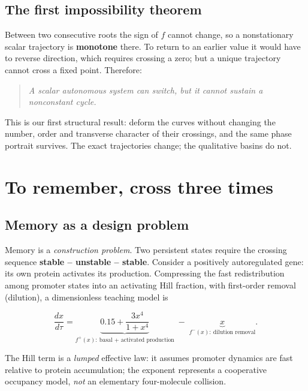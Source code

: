 \documentclass[12pt]{article}
\begin{document}
\subsection{The first impossibility theorem}

Between two consecutive roots the sign of $f$ cannot change, so a nonstationary
scalar trajectory is \textbf{monotone} there. To return to an earlier value it would
have to reverse direction, which requires crossing a zero; but a unique trajectory
cannot cross a fixed point. Therefore:

\begin{quote}
\centering
\emph{A scalar autonomous system can switch, but it cannot sustain a nonconstant
cycle.}
\end{quote}

This is our first structural result: deform the curves without changing the number,
order and transverse character of their crossings, and the same phase portrait
survives. The exact trajectories change; the qualitative basins do not.

\newpage

\section{To remember, cross three times}

\subsection{Memory as a design problem}

Memory is a \emph{construction problem}. Two persistent states require the crossing
sequence \textbf{stable -- unstable -- stable}. Consider a positively autoregulated
gene: its own protein activates its production. Compressing the fast redistribution
among promoter states into an activating Hill fraction, with first-order removal
(dilution), a dimensionless teaching model is

\begin{equation}
\frac{dx}{d\tau} =
\underbrace{0.15 + \frac{3x^{4}}{1+x^{4}}}_{f^{+}(x):\ \text{basal + activated production}}
\;-\;
\underbrace{x}_{f^{-}(x):\ \text{dilution removal}}.
\label{eq:autoreg}
\end{equation}

The Hill term is a \emph{lumped} effective law: it assumes promoter dynamics are fast
relative to protein accumulation; the exponent represents a cooperative occupancy
model, \emph{not} an elementary four-molecule collision.
\end{document}

